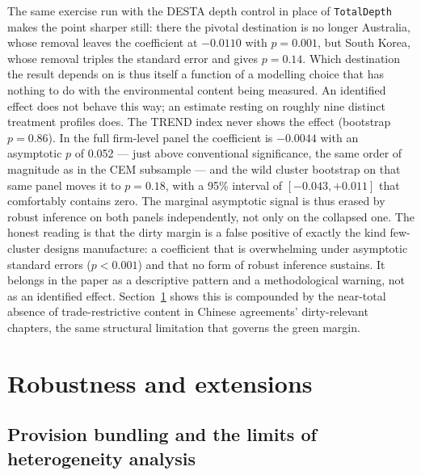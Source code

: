 \documentclass[12pt]{article}
\begin{document}
The same exercise run with the DESTA depth control in place of \texttt{TotalDepth} makes
the point sharper still: there the pivotal destination is no longer Australia, whose
removal leaves the coefficient at $-0.0110$ with $p=0.001$, but South Korea, whose removal
triples the standard error and gives $p=0.14$. Which destination the result depends on is
thus itself a function of a modelling choice that has nothing to do with the environmental
content being measured. An identified effect does not behave this way; an estimate resting
on roughly nine distinct treatment profiles does. The TREND index
never shows the effect (bootstrap $p=0.86$). In
the full firm-level panel the coefficient is $-0.0044$ with an asymptotic $p$ of 0.052
--- just above conventional significance, the same order of magnitude as in the CEM
subsample --- and the wild cluster bootstrap on that same panel moves it to $p=0.18$,
with a 95\% interval of $[-0.043, +0.011]$ that comfortably contains zero. The marginal
asymptotic signal is thus erased by robust inference on both panels independently, not
only on the collapsed one. The honest reading is that the dirty margin is a false positive of exactly the
kind few-cluster designs manufacture: a coefficient that is overwhelming under asymptotic
standard errors ($p<0.001$) and that no form of robust inference sustains. It belongs in
the paper as a descriptive pattern and a methodological warning, not as an identified
effect. Section~\ref{sec:robust} shows this is compounded by the near-total absence of
trade-restrictive content in Chinese agreements' dirty-relevant chapters, the same
structural limitation that governs the green margin.

\section{Robustness and extensions}\label{sec:robust}

\subsection{Provision bundling and the limits of heterogeneity analysis}
\end{document}
